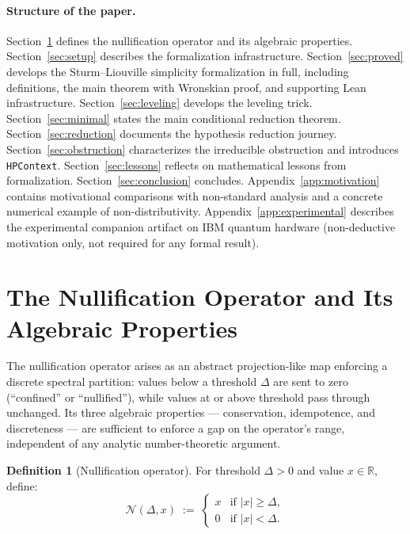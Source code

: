 \documentclass[12pt, a4paper]{article}
\theoremstyle{plain}
\theoremstyle{definition}
\newtheorem{definition}[theorem]{Definition}
\newcommand{\N}{\mathcal{N}}
\newcommand{\R}{\mathbb{R}}
\newcommand{\lean}[1]{\texttt{#1}}
\begin{document}
\paragraph{Structure of the paper.}
Section~\ref{sec:operator} defines the nullification operator and its algebraic
properties.
Section~\ref{sec:setup} describes the formalization infrastructure.
Section~\ref{sec:proved} develops the Sturm--Liouville simplicity formalization in full, including definitions, the main theorem with Wronskian proof, and supporting Lean infrastructure.
Section~\ref{sec:leveling} develops the leveling trick.
Section~\ref{sec:minimal} states the main conditional reduction theorem.
Section~\ref{sec:reduction} documents the hypothesis reduction journey.
Section~\ref{sec:obstruction} characterizes the irreducible obstruction and
introduces \lean{HPContext}.
Section~\ref{sec:lessons} reflects on mathematical lessons from formalization.
Section~\ref{sec:conclusion} concludes.
Appendix~\ref{app:motivation} contains motivational comparisons with
non-standard analysis and a concrete numerical example of non-distributivity.
Appendix~\ref{app:experimental} describes the experimental companion artifact
on IBM quantum hardware (non-deductive motivation only, not required for any
formal result).

\section{The Nullification Operator and Its Algebraic Properties}
\label{sec:operator}

The nullification operator arises as an abstract projection-like map
enforcing a discrete spectral partition: values below a threshold $\Delta$
are sent to zero (``confined'' or ``nullified''), while values at or above
threshold pass through unchanged.
Its three algebraic properties --- conservation, idempotence, and discreteness
--- are sufficient to enforce a gap on the operator's range, independent of
any analytic number-theoretic argument.

\begin{definition}[Nullification operator]
\label{def:nullify}
For threshold $\Delta > 0$ and value $x \in \R$, define:
\[
  \N(\Delta, x) \;:=\;
  \begin{cases}
    x & \text{if } |x| \geq \Delta, \\
    0 & \text{if } |x| < \Delta.
  \end{cases}
\]
\end{definition}
\end{document}
